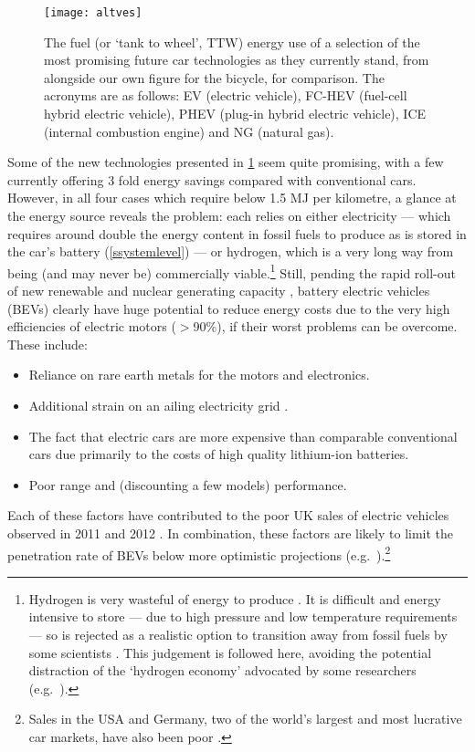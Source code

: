\begin{figure}
 \texttt{[image: altves]}
 \caption[Fuel energy use of future car technologies]
 {The fuel (or `tank to wheel', TTW) energy use of a selection of
 the most promising future car technologies as they currently stand, from
 \citet{Baptista2012} alongside our own figure for the bicycle, for comparison.
 The acronyms are
 as follows: EV (electric vehicle), FC-HEV (fuel-cell hybrid electric vehicle),
 PHEV (plug-in hybrid electric vehicle), ICE (internal combustion engine) and
 NG (natural gas).} \label{faltves}
\end{figure}

Some of the new technologies presented in \cref{faltves} seem quite promising,
with a few currently offering 3 fold energy savings compared with conventional
cars. However, in all four cases which require below 1.5 MJ per kilometre, a
glance at the energy source reveals the problem: each relies on either
electricity --- which requires around double
the energy content in fossil fuels to produce as is stored in the car's
battery (\cref{ssystemlevel})
--- or hydrogen, which is a very long way from being (and may never be)
commercially viable.\footnote{Hydrogen
is very wasteful of energy to produce \citep{Smil2008}. It
is difficult and energy intensive to store --- due to high pressure and low temperature
requirements --- so is rejected as a realistic option to transition away from
fossil fuels by some scientists \citep{MacKay2009, kreith2004fallacies}.
This judgement is followed here, avoiding the potential distraction of the
`hydrogen economy' advocated by some researchers (e.g.~\citealp{Kleijn2010}).
}
Still, pending the rapid roll-out of new renewable and nuclear generating
capacity \citep{dyke2010impact},
battery electric vehicles (BEVs) clearly have huge
potential to reduce energy costs due to the very high efficiencies of
electric motors ($>$90\%), if their worst problems can be overcome.
These include:
\begin{itemize}
 \item Reliance on rare earth metals for the motors and electronics.
 \item Additional strain on an ailing electricity grid \citep{dyke2010impact,
 webster1999can}.
 \item The fact that electric cars are
more expensive than comparable conventional cars due primarily to the costs of
high quality lithium-ion batteries.
\item Poor range and (discounting a few models) performance.
\end{itemize}
Each of these factors have contributed to
the poor UK sales of electric vehicles observed in 2011
\citep{AdamVaughan2011} and 2012 \citep{DavidCornis, Massey2013elecmail}.
In combination, these factors are likely to limit the penetration rate of BEVs below
more optimistic projections (e.g.~\citealp{Shepherd2012}).\footnote{Sales
in the USA and Germany, two of the world's largest and most lucrative car
markets, have also been poor \citep{Hepker, Mihalascu}.}

